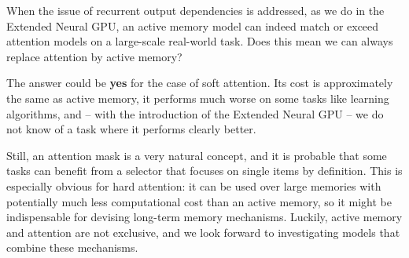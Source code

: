 \documentclass{article}
\begin{document}
When the issue of recurrent output dependencies is addressed,
as we do in the Extended Neural GPU, an active memory model can
indeed match or exceed attention models on a large-scale real-world
task. Does this mean we can always replace attention by active memory?

The answer could be \textbf{yes} for the case of soft attention.
Its cost is approximately the same as active memory, it performs
much worse on some tasks like learning algorithms, and -- with
the introduction of the Extended Neural GPU -- we do not know of a task
where it performs clearly better.

Still, an attention mask is a very natural concept, and it is probable
that some tasks can benefit from a selector that focuses on single
items by definition. This is especially obvious for hard attention:
it can be used over large memories with potentially much less computational
cost than an active memory, so it might be indispensable for
devising long-term memory mechanisms. Luckily, active memory and
attention are not exclusive, and we look forward to investigating
models that combine these mechanisms.


\small


\end{document}
